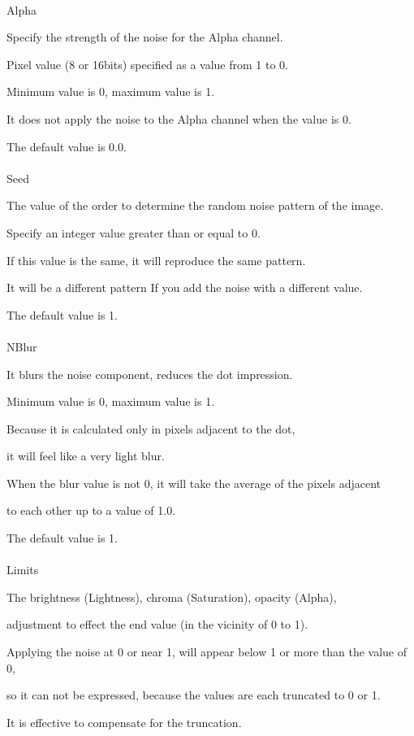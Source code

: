 \documentclass[a4paper,12pt]{article}
\begin{document}
\ \vspace{-0.2em}
\par
\noindent Alpha\par
Specify the strength of the noise for the Alpha channel.\par
Pixel value (8 or 16bits) specified as a value from 1 to 0.\par
Minimum value is 0, maximum value is 1.\par
It does not apply the noise to the Alpha channel when the value is 0.\par
The default value is 0.0.\\
\\
Seed\par
The value of the order to determine the random noise pattern of the image.\par
Specify an integer value greater than or equal to 0.\par
If this value is the same, it will reproduce the same pattern.\par
It will be a different pattern If you add the noise with a different value.\par
The default value is 1.\\
\\
NBlur\par
It blurs the noise component, reduces the dot  impression.\par
Minimum value is 0, maximum value is 1.\par
Because it is calculated only in pixels adjacent to the dot,\par
it will feel like a very light blur.\par
When the blur value is not 0, it will take the average of the pixels adjacent\par
to each other up to a value of 1.0.\par
The default value is 1.\\
\\
Limits\par
The brightness (Lightness), chroma (Saturation), opacity (Alpha),\par
adjustment to effect the end value (in the vicinity of 0 to 1).\par
Applying the noise at 0 or near 1, will appear below 1 or more than the value of 0,\par
so it can not be expressed, because the values are each truncated to 0 or 1.\par
It is effective to compensate for the truncation.\par
\end{document}
